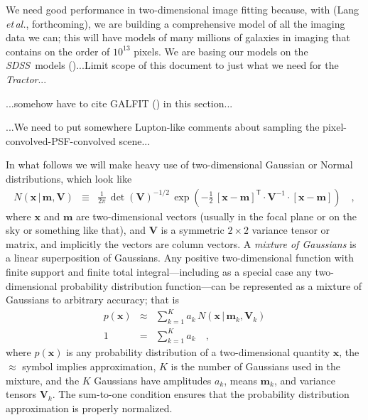 \documentclass[12pt,pdftex,preprint]{aastex}
\newcommand{\foreign}[1]{\textit{#1}}
\newcommand{\etal}{\foreign{et\,al.}}
\newcommand{\project}[1]{\textsl{#1}}
\newcommand{\tractor}{\project{Tractor}}
\newcommand{\sdss}{\project{SDSS}}
\newcommand{\tmatrix}[1]{\boldsymbol{#1}}
\newcommand{\inverse}[1]{{#1}^{-1}}
\newcommand{\transpose}[1]{{#1}^{\mathsf T}}
\newcommand{\tvector}[1]{\boldsymbol{#1}}
\newcommand{\pos}{\tvector{x}}
\newcommand{\mean}{\tvector{m}}
\newcommand{\var}{\tmatrix{V}\!}
\newcommand{\normal}{N}
\newcommand{\given}{\,|\,}
\begin{document}
We need good performance in two-dimensional image fitting because,
with \thetractor (Lang \etal, forthcoming), we are building a
comprehensive model of all the imaging data we can; this will have
models of many millions of galaxies in imaging that contains on the
order of $10^{13}$ pixels.  We are basing our models on the
\sdss\ models (\citealt{lupton})...Limit scope of this document to
just what we need for the \tractor...

...somehow have to cite GALFIT (\citealt{galfit}) in this section...

...We need to put somewhere Lupton-like comments about sampling the
pixel-convolved-PSF-convolved scene...

In what follows we will make heavy use of two-dimensional Gaussian or
Normal distributions, which look like
\begin{eqnarray}\displaystyle
\normal(\pos\given\mean,\var) &\equiv& \frac{1}{2\pi}\,\det(\var)^{-1/2}\,\exp(-\frac{1}{2}\,\transpose{[\pos-\mean]}\cdot\inverse{\var}\cdot[\pos-\mean])
\quad ,
\end{eqnarray}
where $\pos$ and $\mean$ are two-dimensional vectors (usually in the
focal plane or on the sky or something like that), and $\var$ is a
symmetric $2\times 2$ variance tensor or matrix, and implicitly the
vectors are column vectors.  A \emph{mixture of Gaussians} is a linear
superposition of Gaussians.  Any positive two-dimensional function
with finite support and finite total integral---including as a special
case any two-dimensional probability distribution function---can be
represented as a mixture of Gaussians to arbitrary accuracy; that is
\begin{eqnarray}
p(\pos) &\approx& \sum_{k=1}^K a_k\,\normal(\pos\given\mean_k,\var_k)
\\
1 &=& \sum_{k=1}^K a_k
\quad ,
\end{eqnarray}
where $p(\pos)$ is any probability distribution of a two-dimensional
quantity $\pos$, the $\approx$ symbol implies approximation, $K$ is
the number of Gaussians used in the mixture, and the $K$ Gaussians
have amplitudes $a_k$, means $\mean_k$, and variance tensors $\var_k$.
The sum-to-one condition ensures that the probability distribution
approximation is properly normalized.
\end{document}
